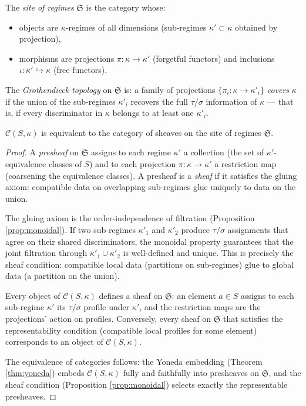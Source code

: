 \begin{definition}\label{def:site}
The \emph{site of regimes} $\mathfrak{S}$ is the category
whose:
\begin{itemize}[nosep]
  \item objects are $\kappa$-regimes of all dimensions
    (sub-regimes $\kappa' \subset \kappa$ obtained by
    projection),
  \item morphisms are projections $\pi: \kappa \to \kappa'$
    (forgetful functors) and inclusions
    $\iota: \kappa' \hookrightarrow \kappa$ (free functors).
\end{itemize}
The \emph{Grothendieck topology} on $\mathfrak{S}$ is:
a family of projections $\{\pi_i: \kappa \to \kappa'_i\}$
\emph{covers} $\kappa$ if the union of the sub-regimes
$\kappa'_i$ recovers the full $\tau/\sigma$ information
of $\kappa$ --- that is, if every discriminator in $\kappa$
belongs to at least one $\kappa'_i$.
\end{definition}

\begin{theorem}\label{thm:sheaf}
$\mathcal{C}(S,\kappa)$ is equivalent to the category of
sheaves on the site of regimes $\mathfrak{S}$.
\end{theorem}

\begin{proof}
A \emph{presheaf} on $\mathfrak{S}$ assigns to each regime
$\kappa'$ a collection (the set of $\kappa'$-equivalence
classes of $S$) and to each projection $\pi: \kappa \to
\kappa'$ a restriction map (coarsening the equivalence
classes). A presheaf is a \emph{sheaf} if it satisfies the
gluing axiom: compatible data on overlapping sub-regimes
glue uniquely to data on the union.

The gluing axiom is the order-independence of filtration
(Proposition \ref{prop:monoidal}). If two sub-regimes
$\kappa'_1$ and $\kappa'_2$ produce $\tau/\sigma$
assignments that agree on their shared discriminators, the
monoidal property guarantees that the joint filtration
through $\kappa'_1 \cup \kappa'_2$ is well-defined and
unique. This is precisely the sheaf condition: compatible
local data (partitions on sub-regimes) glue to global data
(a partition on the union).

Every object of $\mathcal{C}(S,\kappa)$ defines a sheaf
on $\mathfrak{S}$: an element $a \in S$ assigns to each
sub-regime $\kappa'$ its $\tau/\sigma$ profile under
$\kappa'$, and the restriction maps are the projections'
action on profiles. Conversely, every sheaf on $\mathfrak{S}$
that satisfies the representability condition
(compatible local profiles for some element) corresponds
to an object of $\mathcal{C}(S,\kappa)$.

The equivalence of categories follows: the Yoneda
embedding (Theorem \ref{thm:yoneda}) embeds
$\mathcal{C}(S,\kappa)$ fully and faithfully into
presheaves on $\mathfrak{S}$, and the sheaf condition
(Proposition \ref{prop:monoidal}) selects exactly the
representable presheaves.
\end{proof}

